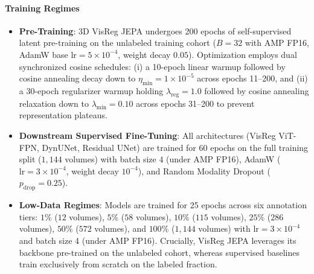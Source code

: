 \documentclass{article}
\begin{document}
\paragraph{Training Regimes}
\begin{itemize}
    \item \textbf{Pre-Training}: 3D VisReg JEPA undergoes 200 epochs of self-supervised latent pre-training on the unlabeled training cohort ($B=32$ with AMP FP16, AdamW base $\text{lr}=5 \times 10^{-4}$, weight decay $0.05$). Optimization employs dual synchronized cosine schedules: (i) a 10-epoch linear warmup followed by cosine annealing decay down to $\eta_{\text{min}} = 1 \times 10^{-5}$ across epochs 11--200, and (ii) a 30-epoch regularizer warmup holding $\lambda_{\text{reg}} = 1.0$ followed by cosine annealing relaxation down to $\lambda_{\text{min}} = 0.10$ across epochs 31--200 to prevent representation plateaus.
    \item \textbf{Downstream Supervised Fine-Tuning}: All architectures (VisReg ViT-FPN, DynUNet, Residual UNet) are trained for 60 epochs on the full training split ($1,144$ volumes) with batch size $4$ (under AMP FP16), AdamW ($\text{lr}=3 \times 10^{-4}$, weight decay $10^{-4}$), and Random Modality Dropout ($p_{\text{drop}}=0.25$).
    \item \textbf{Low-Data Regimes}: Models are trained for 25 epochs across six annotation tiers: $1\%$ ($12$ volumes), $5\%$ ($58$ volumes), $10\%$ ($115$ volumes), $25\%$ ($286$ volumes), $50\%$ ($572$ volumes), and $100\%$ ($1,144$ volumes) with $\text{lr}=3 \times 10^{-4}$ and batch size 4 (under AMP FP16). Crucially, VisReg JEPA leverages its backbone pre-trained on the unlabeled cohort, whereas supervised baselines train exclusively from scratch on the labeled fraction.
\end{itemize}
\end{document}
